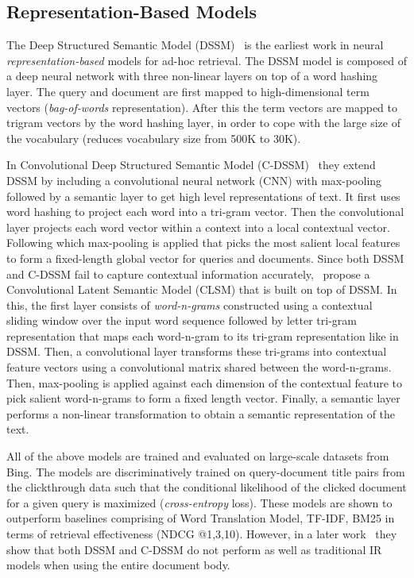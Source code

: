 \subsection{Representation-Based Models}
\label{sec:representation_based}
The \textsf{Deep Structured Semantic Model} (DSSM)~\citep{dssm13} is the earliest work in neural \textit{representation-based} models for ad-hoc retrieval. The DSSM model is composed of a deep neural network with three non-linear layers on top of a word hashing layer. The query and document are first mapped to high-dimensional term vectors (\textit{bag-of-words} representation). After this the term vectors are mapped to trigram vectors by the word hashing layer, in order to cope with the large size of the vocabulary (reduces vocabulary size from 500K to 30K).

In \textsf{Convolutional Deep Structured Semantic Model} (C-DSSM)~\citep{Shen2014b} they extend DSSM by including a convolutional neural network (CNN) with max-pooling followed by a semantic layer to get high level representations of text. It first uses word hashing to project each word into a tri-gram vector. Then the convolutional layer projects each word vector within a context into a local contextual vector. Following which max-pooling is applied that picks the most salient local features to form a fixed-length global vector for queries and documents. Since both DSSM and C-DSSM fail to capture contextual information accurately,~\cite{Shen2014a} propose a \textsf{Convolutional Latent Semantic Model} (CLSM) that is built on top of DSSM. In this, the first layer consists of \textit{word-n-grams} constructed using a contextual sliding window over the input word sequence followed by letter tri-gram representation that maps each word-n-gram to its tri-gram representation like in DSSM. Then, a convolutional layer transforms these tri-grams into contextual feature vectors using a convolutional matrix shared between the word-n-grams. Then, max-pooling is applied against each dimension of the contextual feature to pick salient word-n-grams to form a fixed length vector. Finally, a semantic layer performs a non-linear transformation to obtain a semantic representation of the text. 

All of the above models are trained and evaluated on large-scale datasets from Bing. The models are discriminatively trained on query-document title pairs from the clickthrough data such that the conditional likelihood of the clicked document for a given query is maximized (\textit{cross-entropy} loss). These models are shown to outperform baselines comprising of Word Translation Model, TF-IDF, BM25 in terms of retrieval effectiveness (NDCG @1,3,10). However, in a later work~\citep{Guo2016} they show that both DSSM and C-DSSM do not perform as well as traditional IR models when using the entire document body.


